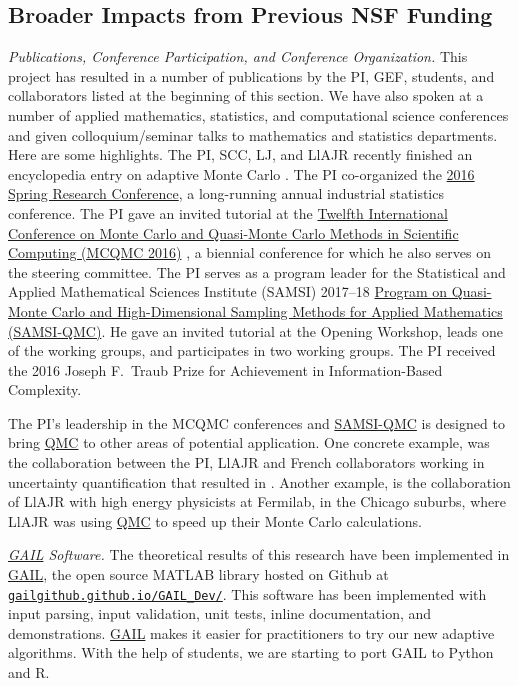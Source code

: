 \documentclass[11pt]{NSFamsart}
\newcommand{\GAIL}{\hyperlink{GAILlink}{GAIL}\xspace}
\newcommand{\QMC}{\hyperlink{QMClink}{QMC}\xspace}
\newcommand{\SAMSIQMC}{\hyperlink{SAMSIlink}{SAMSI-QMC}\xspace}
\begin{document}
\subsection{Broader Impacts from Previous NSF Funding} \label{prevBIsect}

\emph{Publications, Conference Participation, and Conference Organization.} This 
project has resulted in a number of publications by the PI, GEF, students, and collaborators listed at 
the beginning of this section.  We have also spoken at a number of applied mathematics, statistics, 
and computational science conferences and given colloquium/seminar talks to mathematics and 
statistics departments.  Here are some highlights.  The PI, SCC, LJ, and LlAJR recently finished an 
encyclopedia entry on adaptive Monte Carlo \cite{HicEtal18a}.  The PI co-organized the 
\href{http://cos.iit.edu/2016-spring-research-conference/}{2016 Spring Research 
Conference}, a long-running annual industrial statistics conference.   The PI gave an invited tutorial 
at the \href{http://mcqmc2016.stanford.edu}{Twelfth International 
Conference on Monte Carlo and Quasi-Monte Carlo Methods in Scientific Computing (MCQMC 
2016)} 
\cite{Hic17a}, a biennial conference for which he also serves on the steering committee.  The PI 
serves as a program leader for the Statistical and Applied Mathematical Sciences 
Institute (SAMSI) 2017--18 
\href{https://www.samsi.info/programs-and-activities/year-long-research-programs/2017-18-program-quasi-monte-carlo-high-dimensional-sampling-methods-applied-mathematics-qmc/
}{Program on Quasi-Monte Carlo and High-Dimensional Sampling Methods for Applied 
	Mathematics (\hypertarget{SAMSIlink}{SAMSI-QMC})}.   He  gave an invited tutorial 
	at the Opening Workshop, leads one of 
	the working groups, and participates in two working groups.  The PI received the 2016 Joseph F.\ 
	Traub 
	Prize for Achievement in Information-Based Complexity.
	
	
The PI's leadership in the MCQMC conferences  and \SAMSIQMC is 
	designed to bring \QMC to other areas of potential application.  One concrete example, was the 
	collaboration between the PI, LlAJR and French collaborators working in uncertainty quantification 
	that resulted in \cite{GilEtal16a, GilJim16b}.  Another example, is the collaboration of LlAJR with 
	high energy physicists at Fermilab, in the Chicago suburbs, where LlAJR was using \QMC to speed 
	up their Monte Carlo calculations.
	
\emph{\GAIL Software.} The theoretical results of this research have been implemented in 
\GAIL, the open source MATLAB library hosted on Github at 
\href{http://gailgithub.github.io/GAIL_Dev/} {\nolinkurl{gailgithub.github.io/GAIL_Dev/}}. This software 
has been implemented with input parsing, input validation, unit tests, inline documentation, and 
demonstrations.  \GAIL makes it easier for practitioners to try our new adaptive algorithms.  With the 
help of students, we are starting to port GAIL to Python and R.
\end{document}
